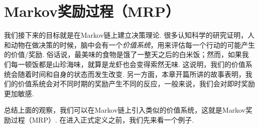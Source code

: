 \section{Markov奖励过程（MRP）}

我们接下来的目标就是在Markov链上建立决策理论. 很多认知科学的研究证明，人和动物在做决策的时候，脑中会有一个\textit{价值系统}，用来评估每一个行动的可能产生的价值/奖励. 俗话说，最美味的食物是饿了一整天之后的白米饭；然而，如果我们每一顿饭都是山珍海味，就算是龙虾也会变得索然无味. 这说明，我们的价值系统会随着时间和自身的状态而发生改变. 另一方面，本章开篇所讲的故事表明，我们的价值系统会对不同时期的奖励产生不同的反应，一般来说，我们会对即时奖励更加敏感.

总结上面的观察，我们可以在Markov链上引入类似的价值系统，这就是Markov奖励过程（MRP）. 在进入正式定义之前，我们先来看一个例子.

